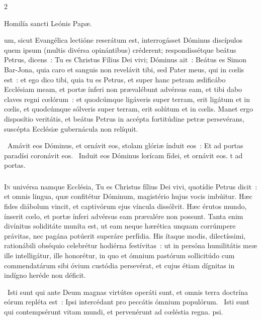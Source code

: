 \documentclass[9pt,twoside]{extarticle}
\begin{document}
\begin{multicols}{2}
\begin{center}Homilía sancti Leónis Papæ.\\
\end{center}
um, sicut Evangélica lectióne reserátum est, interrogásset Dóminus discípulos quem ipsum (multis divérsa opinántibus) créderent; respondissétque beátus Petrus, dicens~: Tu es Christus Fílius Dei vivi; Dóminus ait~: Beátus es Simon Bar-Jona, quia caro et sanguis non revelávit tibi, sed Pater meus, qui in cœlis est~: et ego dico tibi, quia tu es Petrus, et super hanc petram ædificábo Ecclésiam meam, et portæ ínferi non prævalébunt advérsus eam, et tibi dabo claves regni cœlórum~: et quodcúmque ligáveris super terram, erit ligátum et in cœlis, et quodcúmque sólveris super terram, erit solútum et in cœlis. Manet ergo disposítio veritátis, et beátus Petrus in accépta fortitúdine petræ persevérans, suscépta Ecclésiæ gubernácula non relíquit.

\begin{tightlist}{}
\item {}~Amávit eos Dóminus, et ornávit eos, stolam glóriæ índuit eos~: \textred{*} Et ad portas paradísi coronávit eos. ~Induit eos Dóminus lorícam fídei, et ornávit eos. t ad portas.
\end{tightlist}

\subsubsection*{\center {}}
\lettrine{I}n univérsa namque Ecclésia, Tu es Christus fílius Dei vivi, quotídie Petrus dicit~: et omnis lingua, quæ confitétur Dóminum, magistério hujus vocis imbúitur. Hæc fides diábolum vincit, et captivórum ejus víncula dissólvit. Hæc érutos mundo, ínserit cœlo, et portæ ínferi advérsus eam prævalére non possunt. Tanta enim divínitus soliditáte muníta est, ut eam neque hærética unquam corrúmpere právitas, nec pagána potúerit superáre perfídia. His ítaque modis, dilectíssimi, rationábili obséquio celebrétur hodiérna festívitas~: ut in persóna humilitátis meæ ille intelligátur, ille honorétur, in quo et ómnium pastórum sollicitúdo cum commendatárum sibi óvium custódia persevérat, et cujus étiam dígnitas in indígno heréde non déficit.

\begin{tightlist}{}
\item {}~Isti sunt qui ante Deum magnas virtútes operáti sunt, et omnis terra doctrína eórum repléta est~: \textred{*} Ipsi intercédant pro peccátis ómnium populórum. ~Isti sunt qui contempsérunt vitam mundi, et pervenérunt ad cœléstia regna. psi.
\item {}
\end{tightlist}


\end{multicols}
\end{document}
